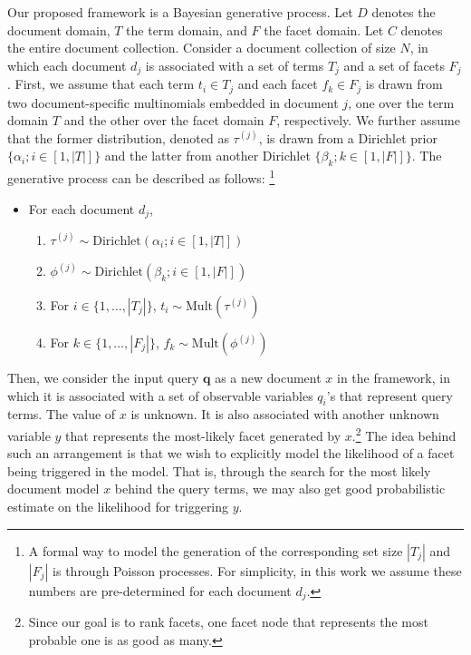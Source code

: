 Our proposed framework is a Bayesian generative process.  Let $D$ denotes the document
domain, $T$ the term domain, and $F$ the facet domain.  Let $C$ denotes the
entire document collection.  Consider a document collection of size $N$, in
which each document $d_j$ is associated with a set of terms $T_j$ and a set of
facets $F_j$.  First, we assume that each term $t_i \in T_j$ and each facet
$f_k \in F_j$ is drawn from two document-specific multinomials embedded
in document $j$, one over the term domain $T$ and the other over the facet domain $F$,
respectively.  We further assume that the former distribution, denoted as
$\tau^{(j)}$, is drawn from a Dirichlet prior $\{ \alpha_i; i \in [1, |T|] \}$
and the latter from another Dirichlet $\{ \beta_k; k \in [1, |F|] \}$.  The
generative process can be described as follows: \footnote{A formal way to model
the generation of the corresponding set size $|T_j|$ and $|F_j|$ is through
Poisson processes.  For simplicity, in this work we assume these numbers are
pre-determined for each document $d_j$.} 

\begin{itemize} 
  \item For each document $d_j$, \begin{enumerate}
    \item $\tau^{(j)} \sim \textrm{Dirichlet}(\alpha_i; i \in [1, |T|])$
    \item $\phi^{(j)} \sim \textrm{Dirichlet}(\beta_k; i \in [1, |F|])$
    \item For $i \in \{ 1, \ldots, |T_j| \}$, $t_i \sim \textrm{Mult}(\tau^{(j)})$ 
    \item For $k \in \{ 1, \ldots, |F_j| \}$, $f_k \sim \textrm{Mult}(\phi^{(j)})$ 
  \end{enumerate}
\end{itemize}

Then, we consider the input query $\mathbf{q}$ as a new document $x$ in the
framework, in which it is associated with a set of observable variables $q_i$'s that represent
query terms.  The value of $x$ is unknown.  It is also associated
with another unknown variable $y$ that represents the most-likely facet generated by
$x$.\footnote{Since our goal is to rank facets, one facet node that represents the most
probable one is as good as many.} The idea behind such an arrangement is that
we wish to explicitly model the likelihood of a facet being triggered in the
model.  That is, through the search for the most likely document model $x$
behind the query terms, we may also get good probabilistic estimate on the
likelihood for triggering $y$.

